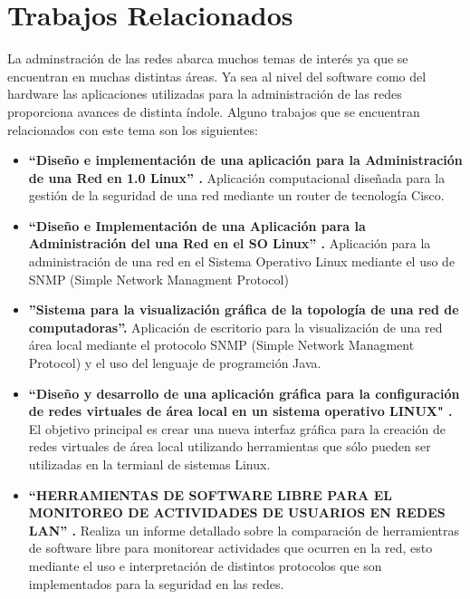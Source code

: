 \section*{Trabajos Relacionados}

La adminstración de las redes abarca muchos temas de interés ya que se encuentran en muchas distintas áreas. 
Ya sea al nivel del software como del hardware las aplicaciones utilizadas para la administración de las redes proporciona
 avances de distinta índole. Alguno trabajos que se encuentran relacionados con este tema son los siguientes:




\begin{itemize}
    \item \textbf{``Diseño e implementación de una aplicación
    para la Administración de una Red en 1.0 Linux''  \cite{Rodriguez10}.} 
    Aplicación computacional diseñada para  la gestión de la seguridad de una red mediante un router
    de tecnología Cisco.    
    \item \textbf{``Diseño e Implementación de una Aplicación para
    la Administración del una Red en el SO Linux''  \cite{Garduno11}.}
     Aplicación para la administración de una red en el Sistema Operativo Linux mediante el uso de SNMP (Simple Network Managment Protocol)
     \item \textbf{''Sistema para la visualización gráfica de la topología de una red de computadoras''\cite{Alcantara15}.}
     Aplicación de escritorio para la visualización de una red área local mediante el protocolo SNMP (Simple Network Managment Protocol) y el uso del lenguaje de programción Java.   
    \item \textbf{``Diseño y desarrollo de una aplicación gráfica para la
    configuración de redes virtuales de área local en un sistema
    operativo LINUX" \cite{Marquez2013}.}
    El objetivo principal es crear una nueva interfaz gráfica para la creación de redes virtuales de área local utilizando herramientas que sólo pueden ser utilizadas en la termianl de sistemas Linux.
    \item \textbf{``HERRAMIENTAS DE SOFTWARE LIBRE PARA EL
    MONITOREO DE ACTIVIDADES DE USUARIOS EN
    REDES LAN'' \cite{Dino2018}.}
    Realiza un informe detallado sobre la comparación de herramientras de software libre para monitorear actividades que ocurren en la red, esto mediante el uso e interpretación de distintos protocolos 
    que son implementados para la seguridad en las redes.

\end{itemize}


